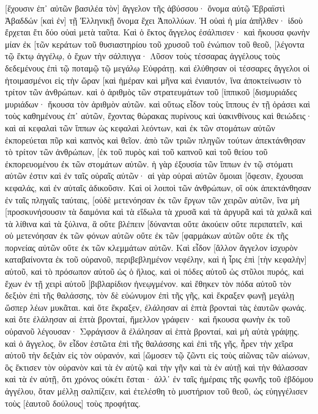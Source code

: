 [ἔχουσιν ἐπ᾽ αὐτῶν βασιλέα τὸν] ἄγγελον τῆς ἀβύσσου· ὄνομα αὐτῷ Ἑβραϊστὶ Ἀβαδδών [καὶ ἐν] τῇ Ἑλληνικῇ ὄνομα ἔχει Ἀπολλύων. 
Ἡ οὐαὶ ἡ μία ἀπῆλθεν· ἰδοὺ ἔρχεται ἔτι δύο οὐαὶ μετὰ ταῦτα. 
Καὶ ὁ ἕκτος ἄγγελος ἐσάλπισεν· καὶ ἤκουσα φωνὴν μίαν ἐκ [τῶν κεράτων τοῦ θυσιαστηρίου τοῦ χρυσοῦ τοῦ ἐνώπιον τοῦ θεοῦ, 
[λέγοντα τῷ ἕκτῳ ἀγγέλῳ, ὁ ἔχων τὴν σάλπιγγα· Λῦσον τοὺς τέσσαρας ἀγγέλους τοὺς δεδεμένους ἐπὶ τῷ ποταμῷ τῷ μεγάλῳ Εὐφράτῃ. 
καὶ ἐλύθησαν οἱ τέσσαρες ἄγγελοι οἱ ἡτοιμασμένοι εἰς τὴν ὥραν [καὶ ἡμέραν καὶ μῆνα καὶ ἐνιαυτόν, ἵνα ἀποκτείνωσιν τὸ τρίτον τῶν ἀνθρώπων. 
καὶ ὁ ἀριθμὸς τῶν στρατευμάτων τοῦ [ἱππικοῦ [δισμυριάδες μυριάδων· ἤκουσα τὸν ἀριθμὸν αὐτῶν. 
καὶ οὕτως εἶδον τοὺς ἵππους ἐν τῇ ὁράσει καὶ τοὺς καθημένους ἐπ᾽ αὐτῶν, ἔχοντας θώρακας πυρίνους καὶ ὑακινθίνους καὶ θειώδεις· καὶ αἱ κεφαλαὶ τῶν ἵππων ὡς κεφαλαὶ λεόντων, καὶ ἐκ τῶν στομάτων αὐτῶν ἐκπορεύεται πῦρ καὶ καπνὸς καὶ θεῖον. 
ἀπὸ τῶν τριῶν πληγῶν τούτων ἀπεκτάνθησαν τὸ τρίτον τῶν ἀνθρώπων, [ἐκ τοῦ πυρὸς καὶ τοῦ καπνοῦ καὶ τοῦ θείου τοῦ ἐκπορευομένου ἐκ τῶν στομάτων αὐτῶν. 
ἡ γὰρ ἐξουσία τῶν ἵππων ἐν τῷ στόματι αὐτῶν ἐστιν καὶ ἐν ταῖς οὐραῖς αὐτῶν· αἱ γὰρ οὐραὶ αὐτῶν ὅμοιαι [ὄφεσιν, ἔχουσαι κεφαλάς, καὶ ἐν αὐταῖς ἀδικοῦσιν. 
Καὶ οἱ λοιποὶ τῶν ἀνθρώπων, οἳ οὐκ ἀπεκτάνθησαν ἐν ταῖς πληγαῖς ταύταις, [οὐδὲ μετενόησαν ἐκ τῶν ἔργων τῶν χειρῶν αὐτῶν, ἵνα μὴ [προσκυνήσουσιν τὰ δαιμόνια καὶ τὰ εἴδωλα τὰ χρυσᾶ καὶ τὰ ἀργυρᾶ καὶ τὰ χαλκᾶ καὶ τὰ λίθινα καὶ τὰ ξύλινα, ἃ οὔτε βλέπειν [δύνανται οὔτε ἀκούειν οὔτε περιπατεῖν, 
καὶ οὐ μετενόησαν ἐκ τῶν φόνων αὐτῶν οὔτε ἐκ τῶν [φαρμάκων αὐτῶν οὔτε ἐκ τῆς πορνείας αὐτῶν οὔτε ἐκ τῶν κλεμμάτων αὐτῶν. 
Καὶ εἶδον [ἄλλον ἄγγελον ἰσχυρὸν καταβαίνοντα ἐκ τοῦ οὐρανοῦ, περιβεβλημένον νεφέλην, καὶ ἡ ἶρις ἐπὶ [τὴν κεφαλὴν] αὐτοῦ, καὶ τὸ πρόσωπον αὐτοῦ ὡς ὁ ἥλιος, καὶ οἱ πόδες αὐτοῦ ὡς στῦλοι πυρός, 
καὶ ἔχων ἐν τῇ χειρὶ αὐτοῦ [βιβλαρίδιον ἠνεῳγμένον. καὶ ἔθηκεν τὸν πόδα αὐτοῦ τὸν δεξιὸν ἐπὶ τῆς θαλάσσης, τὸν δὲ εὐώνυμον ἐπὶ τῆς γῆς, 
καὶ ἔκραξεν φωνῇ μεγάλῃ ὥσπερ λέων μυκᾶται. καὶ ὅτε ἔκραξεν, ἐλάλησαν αἱ ἑπτὰ βρονταὶ τὰς ἑαυτῶν φωνάς. 
καὶ ὅτε ἐλάλησαν αἱ ἑπτὰ βρονταί, ἤμελλον γράφειν· καὶ ἤκουσα φωνὴν ἐκ τοῦ οὐρανοῦ λέγουσαν· Σφράγισον ἃ ἐλάλησαν αἱ ἑπτὰ βρονταί, καὶ μὴ αὐτὰ γράψῃς. 
καὶ ὁ ἄγγελος, ὃν εἶδον ἑστῶτα ἐπὶ τῆς θαλάσσης καὶ ἐπὶ τῆς γῆς, ἦρεν τὴν χεῖρα αὐτοῦ τὴν δεξιὰν εἰς τὸν οὐρανόν, 
καὶ [ὤμοσεν τῷ ζῶντι εἰς τοὺς αἰῶνας τῶν αἰώνων, ὃς ἔκτισεν τὸν οὐρανὸν καὶ τὰ ἐν αὐτῷ καὶ τὴν γῆν καὶ τὰ ἐν αὐτῇ καὶ τὴν θάλασσαν καὶ τὰ ἐν αὐτῇ, ὅτι χρόνος οὐκέτι ἔσται· 
ἀλλ᾽ ἐν ταῖς ἡμέραις τῆς φωνῆς τοῦ ἑβδόμου ἀγγέλου, ὅταν μέλλῃ σαλπίζειν, καὶ ἐτελέσθη τὸ μυστήριον τοῦ θεοῦ, ὡς εὐηγγέλισεν τοὺς [ἑαυτοῦ δούλους] τοὺς προφήτας. 
